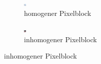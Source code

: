 \begin{figure}[H]
    \centering
    \begin{subfigure}[b]{0.4\textwidth}
        \centering \includegraphics[interpolate=false, width=\linewidth]{content/TemporalerAlg/Bilder/APosteriori/homogener_ausschnitt_blocksize.png}
        \caption{homogener Pixelblock}
        \label{fig:homogener Pixelblock}
    \end{subfigure}
    \begin{subfigure}[b]{0.4\textwidth}
        \centering \includegraphics[interpolate=false,width=\linewidth]{content/TemporalerAlg/Bilder/APosteriori/inhomogener_ausschnitt_blocksize.png}
        \caption{inhomogener Pixelblock}
        \label{fig:Inhomogener Pixelblock}
    \end{subfigure}


\end{figure}
